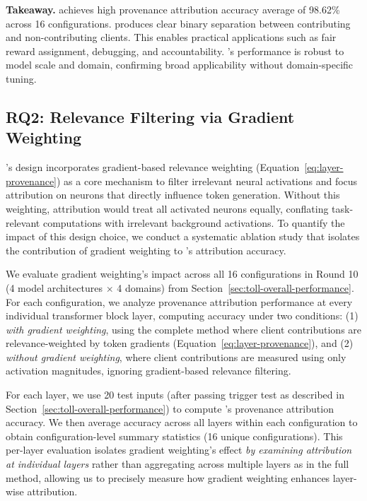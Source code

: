 \begin{tcolorbox}[colback=white, colframe=black,  left=0pt, right=0pt, top=0pt, bottom=0pt]
  \textbf{Takeaway.} \tool achieves high provenance attribution accuracy average of 98.62\% across 16 configurations.
  \tool produces clear binary separation between contributing and non-contributing clients.
  This enables practical applications such as fair reward assignment, debugging, and accountability.
  \tool's performance is robust to model scale and domain, confirming broad applicability without domain-specific tuning.
\end{tcolorbox}



\subsection{RQ2: Relevance Filtering via Gradient Weighting}

\tool's design incorporates gradient-based relevance weighting (Equation~\ref{eq:layer-provenance}) as a core mechanism to filter irrelevant neural activations and focus attribution on neurons that directly influence token generation.
Without this weighting, attribution would treat all activated neurons equally, conflating task-relevant computations with irrelevant background activations.
To quantify the impact of this design choice, we conduct a systematic ablation study that isolates the contribution of gradient weighting to \tool's attribution accuracy.

We evaluate gradient weighting's impact across all 16 configurations in Round 10 (4 model architectures $\times$ 4 domains) from Section~\ref{sec:toll-overall-performance}.
For each configuration, we analyze provenance attribution performance at every individual transformer block layer, computing accuracy under two conditions:
(1) \textit{with gradient weighting}, using the complete \tool method where client contributions are relevance-weighted by token gradients (Equation~\ref{eq:layer-provenance}), and 
(2) \textit{without gradient weighting}, where client contributions are measured using only activation magnitudes, ignoring gradient-based relevance filtering.

For each layer, we use 20 test inputs (after passing trigger test as described in Section~\ref{sec:toll-overall-performance}) to compute \tool's provenance attribution accuracy. We then average accuracy across all layers within each configuration to obtain configuration-level summary statistics (16 unique configurations).
This per-layer evaluation isolates gradient weighting's effect \emph{by examining attribution at individual layers} rather than aggregating across multiple layers as in the full \tool method, allowing us to precisely measure how gradient weighting enhances layer-wise attribution.

